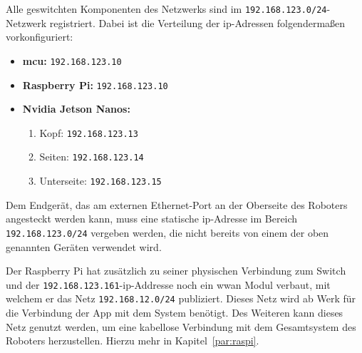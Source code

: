 Alle geswitchten Komponenten des Netzwerks sind im \texttt{192.168.123.0/24}-Netzwerk registriert.
Dabei ist die Verteilung der \gls{ip}-Adressen folgendermaßen vorkonfiguriert:
\begin{itemize}
    \item \textbf{\gls{mcu}:} \texttt{192.168.123.10}
    \item \textbf{Raspberry Pi:} \texttt{192.168.123.10}
    \item \textbf{Nvidia Jetson Nanos:}
    \begin{enumerate}
        \item Kopf: \texttt{192.168.123.13}
        \item Seiten: \texttt{192.168.123.14}
        \item Unterseite: \texttt{192.168.123.15}
    \end{enumerate}
\end{itemize}
Dem Endgerät, das am externen Ethernet-Port an der Oberseite des Roboters angesteckt werden kann,
muss eine statische \gls{ip}-Adresse im Bereich \texttt{192.168.123.0/24} vergeben werden, die nicht bereits von einem der oben genannten
Geräten verwendet wird.

Der Raspberry Pi hat zusätzlich zu seiner physischen Verbindung zum Switch und der \texttt{192.168.123.161}-\gls{ip}-Addresse
noch ein \gls{wwan} Modul verbaut, mit welchem er das Netz \texttt{192.168.12.0/24} publiziert.
Dieses Netz wird ab Werk für die Verbindung der App mit dem System benötigt.
Des Weiteren kann dieses Netz genutzt werden, um eine kabellose Verbindung mit dem Gesamtsystem
des Roboters herzustellen.
Hierzu mehr in Kapitel~\ref{par:raspi}.



